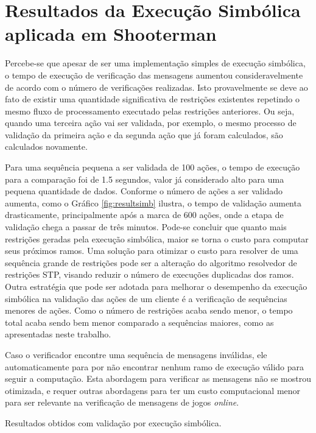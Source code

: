 \section{Resultados da Execução Simbólica aplicada em Shooterman}

Percebe-se que apesar de ser uma implementação simples de execução simbólica, o tempo de execução de verificação das mensagens aumentou consideravelmente de acordo com o número de verificações realizadas. Isto provavelmente se deve ao fato de existir uma quantidade significativa de restrições existentes repetindo o mesmo fluxo de processamento executado pelas restrições anteriores. Ou seja, quando uma terceira ação vai ser validada, por exemplo, o mesmo processo de validação da primeira ação e da segunda ação que já foram calculados, são calculados novamente. 

Para uma sequência pequena a ser validada de 100 ações, o tempo de execução para a comparação foi de 1.5 segundos, valor já considerado alto para uma pequena quantidade de dados. Conforme o número de ações a ser validado aumenta, como o Gráfico \ref{fig:resultsimb} ilustra, o tempo de validação aumenta drasticamente, principalmente após a marca de 600 ações, onde a etapa de validação chega a passar de três minutos. 
Pode-se concluir que quanto mais restrições geradas pela execução simbólica, maior se torna o custo para computar seus próximos ramos. Uma solução para otimizar o custo para resolver de uma sequência grande de restrições pode ser a alteração do algoritmo resolvedor de restrições STP, visando reduzir o número de execuções duplicadas dos ramos. Outra estratégia que pode ser adotada para melhorar o desempenho da execução simbólica na validação das ações de um cliente é a verificação de sequências menores de ações. Como o número de restrições acaba sendo menor, o tempo total acaba sendo bem menor comparado a sequências maiores, como as apresentadas neste trabalho. 

Caso o verificador encontre uma sequência de mensagens inválidas, ele automaticamente para por não encontrar nenhum ramo de execução válido para seguir a computação. Esta abordagem para verificar as mensagens não se mostrou otimizada, e requer outras abordagens para ter um custo computacional menor para ser relevante na verificação de mensagens de jogos \textit{online}.

\begin{grafico}[h!]
	\begin{center}
		\scalebox{0.8}{
					
			}
		\caption[Resultados obtidos com verificação por execução simbólica.]{Resultados obtidos com validação por execução simbólica.}
		\label{fig:resultsimb}	
	\end{center}

\end{grafico}

